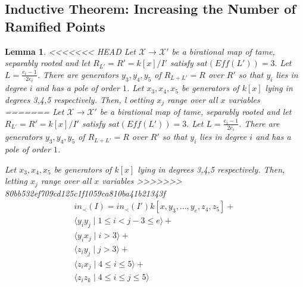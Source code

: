 \documentclass{amsart}
\theoremstyle{plain}
\newtheorem{lem}[thm]{Lemma}
\theoremstyle{definition}
\theoremstyle{remark}
\numberwithin{equation}{section}
\newcommand\ssec{\subsection}
\newcommand \sx{\mathscr X}
\newcommand \halfcan{L}
\newcommand \subhalf[1]{\frac{e_{#1} - 1}{2e_{#1}}}
\begin{document}
\ssec{Inductive Theorem: Increasing the Number of Ramified Points}
\label{ssec:g_0_ram_pts}


\begin{lem}
\label{sat_three_induction}
<<<<<<< HEAD
Let $\sx \rightarrow \sx'$ be a birational map of tame, separably rooted  and let $R_{\halfcan'} = R' = k[x]/I'$ satisfy $sat(Eff(\halfcan')) = 3.$ Let $\halfcan = \subhalf i$. There are generators $y_3,y_4,y_5$ of $R_{\halfcan+\halfcan'}= R$ over $R'$ so that $y_i$ lies in degree $i$ and has a pole of order $1$.  
Let $x_3,x_4,x_5$ be generators of $k[x]$ lying in degrees 3,4,5 respectively.  Then, l oetting $x_j$ range over all $x$ variables
=======
Let $\sx \rightarrow \sx'$ be a birational map of tame, separably
rooted  and let $R_{\halfcan'} = R' = k[x]/I'$ satisfy $sat(Eff(
\halfcan')) = 3.$ Let $\halfcan = \subhalf i$. There are generators
$y_3,y_4,y_5$ of $R_{\halfcan+\halfcan'}= R$ over $R'$ so that $y_i$
 lies in degree $i$ and has a pole of order $1$. 

Let $x_3,x_4,x_5$ be generators of $k[x]$ lying in degrees 3,4,5 
respectively.  Then, letting $x_j$ range over all $x$ variables
>>>>>>> 80bb532ef709cd125c1f1059ca810ba41b21343f
\begin{align*}
	in_\prec(I) = in_\prec(I')k[x,y_3,\ldots, y_e,z_4,z_5] + \\
	\langle y_i y_j \mid 1 \leq i < j-3 \leq e \rangle +\\
	\langle y_i x_j \mid i > 3 \rangle +\\
	\langle z_i y_j \mid j > 3 \rangle  +\\
	\langle z_i x_j \mid 4 \leq i \leq 5\rangle + \\
	\langle z_iz_k \mid 4 \leq i \leq j \leq 5 \rangle 
\end{align*}
\end{lem}
\end{document}

